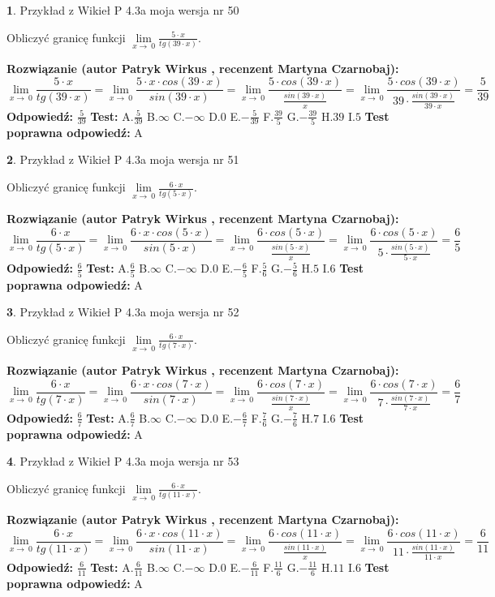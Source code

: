 \documentclass[12pt, a4paper]{article}
\theoremstyle{definition} %
\newtheorem{zad}{}
\newcommand{\zadStart}[1]{\begin{zad}#1\newline}
\newcommand{\zadStop}{\end{zad}}
\newcommand{\rozwStart}[2]{\noindent \textbf{Rozwiązanie (autor #1 , recenzent #2): }\newline}
\newcommand{\rozwStop}{\newline}
\newcommand{\odpStart}{\noindent \textbf{Odpowiedź:}\newline}
\newcommand{\odpStop}{\newline}
\newcommand{\testStart}{\noindent \textbf{Test:}\newline}
\newcommand{\testStop}{\newline}
\newcommand{\kluczStart}{\noindent \textbf{Test poprawna odpowiedź:}\newline}
\newcommand{\kluczStop}{\newline}
\begin{document}
\zadStart{Przykład z Wikieł P 4.3a moja wersja nr 50}


Obliczyć granicę funkcji $\lim\limits_{x\to\ 0}\frac{5 \cdot x}{tg(39 \cdot x)}$.
\zadStop
\rozwStart{Patryk Wirkus}{Martyna Czarnobaj}
$$\lim\limits_{x\to\ 0}\frac{5 \cdot x}{tg(39 \cdot x)}=\lim\limits_{x\to\ 0}\frac{5 \cdot x \cdot cos(39 \cdot x)}{sin(39 \cdot x)}=\lim\limits_{x\to\ 0}\frac{5 \cdot cos(39 \cdot x)}{\frac{sin(39 \cdot x)}{x}}=\lim\limits_{x\to\ 0}\frac{5 \cdot cos(39 \cdot x)}{39 \cdot \frac{sin(39 \cdot x)}{39 \cdot x}} = \frac{5}{39}$$
\rozwStop
\odpStart
$\frac{5}{39}$
\odpStop
\testStart
A.$\frac{5}{39}$
B.$\infty$
C.$-\infty$
D.$0$
E.$-\frac{5}{39}$
F.$\frac{39}{5}$
G.$-\frac{39}{5}$
H.$39$
I.$5$
\testStop
\kluczStart
A
\kluczStop



\zadStart{Przykład z Wikieł P 4.3a moja wersja nr 51}


Obliczyć granicę funkcji $\lim\limits_{x\to\ 0}\frac{6 \cdot x}{tg(5 \cdot x)}$.
\zadStop
\rozwStart{Patryk Wirkus}{Martyna Czarnobaj}
$$\lim\limits_{x\to\ 0}\frac{6 \cdot x}{tg(5 \cdot x)}=\lim\limits_{x\to\ 0}\frac{6 \cdot x \cdot cos(5 \cdot x)}{sin(5 \cdot x)}=\lim\limits_{x\to\ 0}\frac{6 \cdot cos(5 \cdot x)}{\frac{sin(5 \cdot x)}{x}}=\lim\limits_{x\to\ 0}\frac{6 \cdot cos(5 \cdot x)}{5 \cdot \frac{sin(5 \cdot x)}{5 \cdot x}} = \frac{6}{5}$$
\rozwStop
\odpStart
$\frac{6}{5}$
\odpStop
\testStart
A.$\frac{6}{5}$
B.$\infty$
C.$-\infty$
D.$0$
E.$-\frac{6}{5}$
F.$\frac{5}{6}$
G.$-\frac{5}{6}$
H.$5$
I.$6$
\testStop
\kluczStart
A
\kluczStop



\zadStart{Przykład z Wikieł P 4.3a moja wersja nr 52}


Obliczyć granicę funkcji $\lim\limits_{x\to\ 0}\frac{6 \cdot x}{tg(7 \cdot x)}$.
\zadStop
\rozwStart{Patryk Wirkus}{Martyna Czarnobaj}
$$\lim\limits_{x\to\ 0}\frac{6 \cdot x}{tg(7 \cdot x)}=\lim\limits_{x\to\ 0}\frac{6 \cdot x \cdot cos(7 \cdot x)}{sin(7 \cdot x)}=\lim\limits_{x\to\ 0}\frac{6 \cdot cos(7 \cdot x)}{\frac{sin(7 \cdot x)}{x}}=\lim\limits_{x\to\ 0}\frac{6 \cdot cos(7 \cdot x)}{7 \cdot \frac{sin(7 \cdot x)}{7 \cdot x}} = \frac{6}{7}$$
\rozwStop
\odpStart
$\frac{6}{7}$
\odpStop
\testStart
A.$\frac{6}{7}$
B.$\infty$
C.$-\infty$
D.$0$
E.$-\frac{6}{7}$
F.$\frac{7}{6}$
G.$-\frac{7}{6}$
H.$7$
I.$6$
\testStop
\kluczStart
A
\kluczStop



\zadStart{Przykład z Wikieł P 4.3a moja wersja nr 53}


Obliczyć granicę funkcji $\lim\limits_{x\to\ 0}\frac{6 \cdot x}{tg(11 \cdot x)}$.
\zadStop
\rozwStart{Patryk Wirkus}{Martyna Czarnobaj}
$$\lim\limits_{x\to\ 0}\frac{6 \cdot x}{tg(11 \cdot x)}=\lim\limits_{x\to\ 0}\frac{6 \cdot x \cdot cos(11 \cdot x)}{sin(11 \cdot x)}=\lim\limits_{x\to\ 0}\frac{6 \cdot cos(11 \cdot x)}{\frac{sin(11 \cdot x)}{x}}=\lim\limits_{x\to\ 0}\frac{6 \cdot cos(11 \cdot x)}{11 \cdot \frac{sin(11 \cdot x)}{11 \cdot x}} = \frac{6}{11}$$
\rozwStop
\odpStart
$\frac{6}{11}$
\odpStop
\testStart
A.$\frac{6}{11}$
B.$\infty$
C.$-\infty$
D.$0$
E.$-\frac{6}{11}$
F.$\frac{11}{6}$
G.$-\frac{11}{6}$
H.$11$
I.$6$
\testStop
\kluczStart
A
\kluczStop
\end{document}
